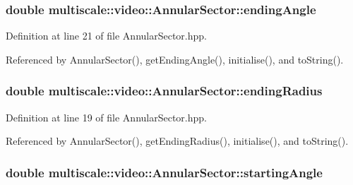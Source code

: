 \hypertarget{classmultiscale_1_1video_1_1AnnularSector_a0aebd11072dbefe42196d6bda2e4318d}{
\subsubsection[{ending\-Angle}]{\setlength{\rightskip}{0pt plus 5cm}double multiscale\-::video\-::\-Annular\-Sector\-::ending\-Angle\hspace{0.3cm}{\ttfamily [private]}}}\label{classmultiscale_1_1video_1_1AnnularSector_a0aebd11072dbefe42196d6bda2e4318d}


Definition at line 21 of file Annular\-Sector.\-hpp.



Referenced by Annular\-Sector(), get\-Ending\-Angle(), initialise(), and to\-String().

\hypertarget{classmultiscale_1_1video_1_1AnnularSector_aa45c5399240707d0b3fc02ee86b97c79}{
\subsubsection[{ending\-Radius}]{\setlength{\rightskip}{0pt plus 5cm}double multiscale\-::video\-::\-Annular\-Sector\-::ending\-Radius\hspace{0.3cm}{\ttfamily [private]}}}\label{classmultiscale_1_1video_1_1AnnularSector_aa45c5399240707d0b3fc02ee86b97c79}


Definition at line 19 of file Annular\-Sector.\-hpp.



Referenced by Annular\-Sector(), get\-Ending\-Radius(), initialise(), and to\-String().

\hypertarget{classmultiscale_1_1video_1_1AnnularSector_a437d3dc1b2fadace28bdc3d26a78c0b3}{
\subsubsection[{starting\-Angle}]{\setlength{\rightskip}{0pt plus 5cm}double multiscale\-::video\-::\-Annular\-Sector\-::starting\-Angle\hspace{0.3cm}{\ttfamily [private]}}}\label{classmultiscale_1_1video_1_1AnnularSector_a437d3dc1b2fadace28bdc3d26a78c0b3}



